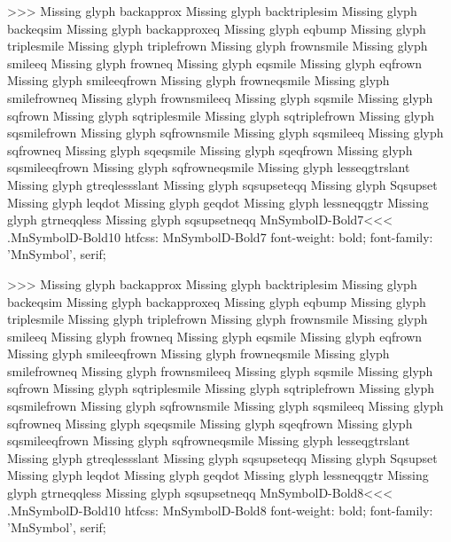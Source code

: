 >>>
Missing glyph	backapprox
Missing glyph	backtriplesim
Missing glyph	backeqsim
Missing glyph	backapproxeq
Missing glyph	eqbump
Missing glyph	triplesmile
Missing glyph	triplefrown
Missing glyph	frownsmile
Missing glyph	smileeq
Missing glyph	frowneq
Missing glyph	eqsmile
Missing glyph	eqfrown
Missing glyph	smileeqfrown
Missing glyph	frowneqsmile
Missing glyph	smilefrowneq
Missing glyph	frownsmileeq
Missing glyph	sqsmile
Missing glyph	sqfrown
Missing glyph	sqtriplesmile
Missing glyph	sqtriplefrown
Missing glyph	sqsmilefrown
Missing glyph	sqfrownsmile
Missing glyph	sqsmileeq
Missing glyph	sqfrowneq
Missing glyph	sqeqsmile
Missing glyph	sqeqfrown
Missing glyph	sqsmileeqfrown
Missing glyph	sqfrowneqsmile
Missing glyph	lesseqgtrslant
Missing glyph	gtreqlessslant
Missing glyph	sqsupseteqq
Missing glyph	Sqsupset
Missing glyph	leqdot
Missing glyph	geqdot
Missing glyph	lessneqqgtr
Missing glyph	gtrneqqless
Missing glyph	sqsupsetneqq
\<MnSymbolD-Bold7\><<<
.MnSymbolD-Bold10
htfcss:  MnSymbolD-Bold7  font-weight: bold; font-family: 'MnSymbol', serif;

>>>
Missing glyph	backapprox
Missing glyph	backtriplesim
Missing glyph	backeqsim
Missing glyph	backapproxeq
Missing glyph	eqbump
Missing glyph	triplesmile
Missing glyph	triplefrown
Missing glyph	frownsmile
Missing glyph	smileeq
Missing glyph	frowneq
Missing glyph	eqsmile
Missing glyph	eqfrown
Missing glyph	smileeqfrown
Missing glyph	frowneqsmile
Missing glyph	smilefrowneq
Missing glyph	frownsmileeq
Missing glyph	sqsmile
Missing glyph	sqfrown
Missing glyph	sqtriplesmile
Missing glyph	sqtriplefrown
Missing glyph	sqsmilefrown
Missing glyph	sqfrownsmile
Missing glyph	sqsmileeq
Missing glyph	sqfrowneq
Missing glyph	sqeqsmile
Missing glyph	sqeqfrown
Missing glyph	sqsmileeqfrown
Missing glyph	sqfrowneqsmile
Missing glyph	lesseqgtrslant
Missing glyph	gtreqlessslant
Missing glyph	sqsupseteqq
Missing glyph	Sqsupset
Missing glyph	leqdot
Missing glyph	geqdot
Missing glyph	lessneqqgtr
Missing glyph	gtrneqqless
Missing glyph	sqsupsetneqq
\<MnSymbolD-Bold8\><<<
.MnSymbolD-Bold10
htfcss:  MnSymbolD-Bold8  font-weight: bold; font-family: 'MnSymbol', serif;

